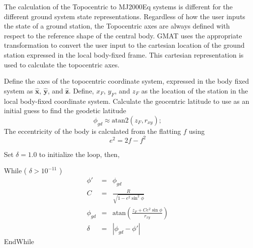 {The calculation of the Topocentric to MJ2000Eq systems is different
for the different ground system state representations.  Regardless of
how the user inputs the state of a ground station, the Topocentric
axes are always defined with respect to the reference shape of the central body.  GMAT uses
the appropriate transformation to convert the user input to the cartesian location
of the ground station expressed in the local body-fixed frame.
This cartesian representation is used to calculate the topocentric axes.

Define the axes of the topocentric coordinate
system, expressed in the body fixed system as $\hat{\mathbf{x}}$,
$\hat{\mathbf{y}}$, and $\hat{\mathbf{z}}$.  Define, $x_F$, $y_F$, and $z_F$ as the location of the station in the local body-fixed coordinate system.
Calculate the geocentric latitude to use as an initial guess to find
the geodetic latitude
%
\begin{equation}
     \phi_{gd}  \approx \mbox{atan2}(z_F,  r_{xy}  );
\end{equation}
%
The eccentricity of the body is calculated from the flatting $f$ using
%
\begin{equation}
    e^2 = 2f-f^2
\end{equation}
%

\noindent Set $\delta = 1.0$ to initialize the loop, then,

\noindent While ( $\delta > 10^{-11}$ )
%
\begin{eqnarray}
   \phi' & = & \phi_{gd}\\
   C & = & \frac{R} { \sqrt{1 - e^2\sin^2{\phi}}    }\\
   \phi_{gd} & = & \mbox{atan} \left( \frac{z_F + C
   e^2\sin{\phi}}{r_{xy}}
   \right)\\
   \delta & = & | \phi_{gd} - \phi' |
\end{eqnarray}
%
EndWhile\\


}
